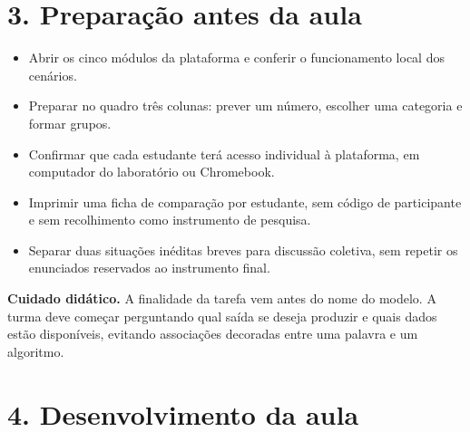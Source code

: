 \documentclass[12pt,a4paper]{article}
\newcommand{\bloco}[1]{%
  \vspace{0.25em}
  \noindent\colorbox{cinza}{\parbox{0.96\linewidth}{#1}}%
  \vspace{0.3em}
}
\begin{document}
\section*{3. Preparação antes da aula}

\begin{itemize}
  \item Abrir os cinco módulos da plataforma e conferir o funcionamento local dos cenários.
  \item Preparar no quadro três colunas: prever um número, escolher uma categoria e formar grupos.
  \item Confirmar que cada estudante terá acesso individual à plataforma, em computador do laboratório ou Chromebook.
  \item Imprimir uma ficha de comparação por estudante, sem código de participante e sem recolhimento como instrumento de pesquisa.
  \item Separar duas situações inéditas breves para discussão coletiva, sem repetir os enunciados reservados ao instrumento final.
\end{itemize}

\bloco{\textbf{Cuidado didático.} A finalidade da tarefa vem antes do nome do modelo. A turma deve começar perguntando qual saída se deseja produzir e quais dados estão disponíveis, evitando associações decoradas entre uma palavra e um algoritmo.}

\section*{4. Desenvolvimento da aula}
\end{document}
